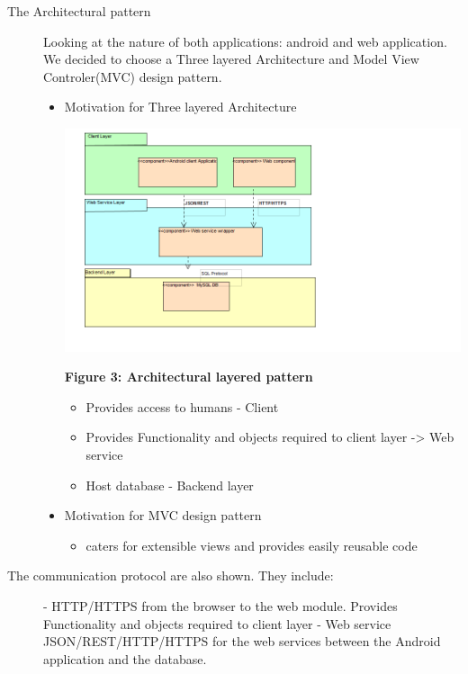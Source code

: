 \documentclass[10pt,a4paper]{article}
\begin{document}
\begin{description}
\item [The Architectural pattern]
Looking at the nature of both applications: android and web application. We decided to choose a Three layered Architecture and Model View Controler(MVC) design pattern.
\begin{itemize}
	\item Motivation for Three layered Architecture
		\begin{center}
			\includegraphics[scale=0.4]{Architectural-Pattern.png}
			
			\textbf{Figure 3: Architectural layered pattern}
		\end{center}
		\begin{itemize}
		\item Provides access to humans  - Client
		\item Provides Functionality  and objects required to client layer -> Web service
		\item Host database - Backend layer
		\end{itemize}
	\item Motivation for MVC design pattern
		\begin{itemize}
			\item caters for extensible views and provides easily reusable code
		\end{itemize}
\end{itemize}


\item [The communication protocol are also shown. They include:]

- HTTP/HTTPS from the browser to the web module.
Provides Functionality  and objects required to client layer - Web service
JSON/REST/HTTP/HTTPS for the web services between the Android application and the database.


\end{description}
\end{document}
